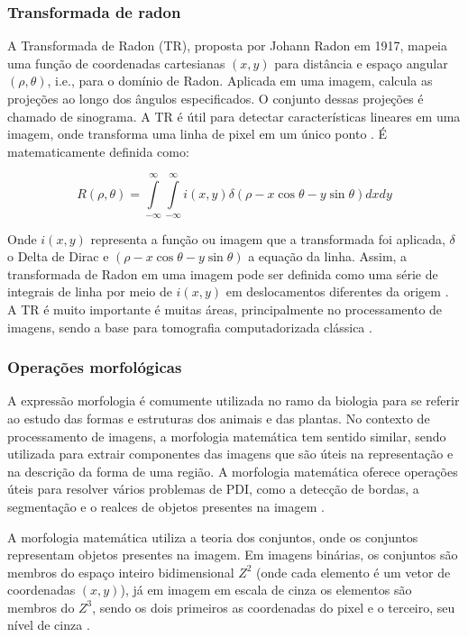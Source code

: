 \documentclass[12pt, a4paper, english, brazil]{article}
\begin{document}
\subsubsection{Transformada de radon}

A Transformada de Radon (TR), proposta por Johann Radon em 1917, mapeia uma função de coordenadas cartesianas $(x, y)$ para distância e espaço angular $(\rho, \theta)$, i.e., para o domínio de Radon. Aplicada em uma imagem, calcula as projeções ao longo dos ângulos especificados. O conjunto dessas projeções é chamado de sinograma. A TR é útil para detectar características lineares em uma imagem, onde transforma uma linha de pixel em um único ponto \cite{Kaur_Sahambi_2015}. É matematicamente definida como:

\begin{equation}
R(\rho, \theta) = \int\limits _{-\infty}^\infty \int\limits _{-\infty}^\infty i (x, y) \delta (\rho - x\cos \theta - y\sin \theta ) dxdy
\end{equation}

Onde $i (x, y)$ representa a função ou imagem que a transformada foi aplicada, $\delta$ o Delta de Dirac e $(\rho - x\cos \theta - y\sin \theta)$ a equação da linha.
Assim, a transformada de Radon em uma imagem pode ser definida como uma série de integrais de linha por meio de $i (x, y)$ em deslocamentos diferentes da origem \cite{Li_2019}. A TR é muito importante é muitas áreas, principalmente no processamento de imagens, sendo a base para tomografia computadorizada clássica \cite{Silva_Escarpinati_Backes_2021}.

\subsubsection{Operações morfológicas}

A expressão morfologia é comumente utilizada no ramo da biologia para se referir ao estudo das formas e estruturas dos animais e das plantas. No contexto de processamento de imagens, a morfologia matemática tem sentido similar, sendo utilizada para extrair componentes das imagens que são úteis na representação e na descrição da forma de uma região. A morfologia matemática oferece operações úteis para resolver vários problemas de PDI, como a detecção de bordas, a segmentação e o realces de objetos presentes na imagem \cite{Marques_Filho_1999}.

A morfologia matemática utiliza a teoria dos conjuntos, onde os conjuntos representam objetos presentes na imagem. Em imagens binárias, os conjuntos são membros do espaço inteiro bidimensional $Z^2$ (onde cada elemento é um vetor de coordenadas $(x, y)$), já em imagem em escala de cinza os elementos são membros do $Z^3$, sendo os dois primeiros as coordenadas do pixel e o terceiro, seu nível de cinza \cite{Gonzalez_Woods_2010}.
\end{document}
